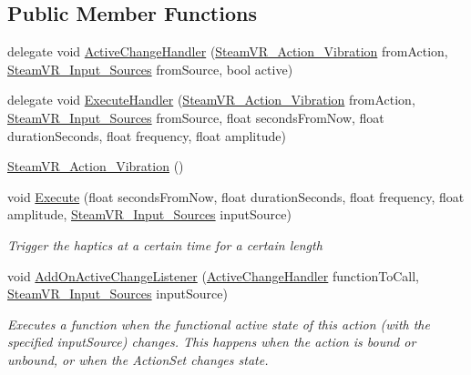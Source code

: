 \subsection*{Public Member Functions}
\begin{DoxyCompactItemize}
\item 
delegate void \mbox{\hyperlink{class_valve_1_1_v_r_1_1_steam_v_r___action___vibration_a7706b3c9b71de3bea16a3fab8a882f0b}{Active\+Change\+Handler}} (\mbox{\hyperlink{class_valve_1_1_v_r_1_1_steam_v_r___action___vibration}{Steam\+V\+R\+\_\+\+Action\+\_\+\+Vibration}} from\+Action, \mbox{\hyperlink{namespace_valve_1_1_v_r_a82e5bf501cc3aa155444ee3f0662853f}{Steam\+V\+R\+\_\+\+Input\+\_\+\+Sources}} from\+Source, bool active)
\item 
delegate void \mbox{\hyperlink{class_valve_1_1_v_r_1_1_steam_v_r___action___vibration_ac075e9e8f3e9eea89be32c403e6f86d5}{Execute\+Handler}} (\mbox{\hyperlink{class_valve_1_1_v_r_1_1_steam_v_r___action___vibration}{Steam\+V\+R\+\_\+\+Action\+\_\+\+Vibration}} from\+Action, \mbox{\hyperlink{namespace_valve_1_1_v_r_a82e5bf501cc3aa155444ee3f0662853f}{Steam\+V\+R\+\_\+\+Input\+\_\+\+Sources}} from\+Source, float seconds\+From\+Now, float duration\+Seconds, float frequency, float amplitude)
\item 
\mbox{\hyperlink{class_valve_1_1_v_r_1_1_steam_v_r___action___vibration_a8fafb6f9a381a3e3084686eb1cd9d1f2}{Steam\+V\+R\+\_\+\+Action\+\_\+\+Vibration}} ()
\item 
void \mbox{\hyperlink{class_valve_1_1_v_r_1_1_steam_v_r___action___vibration_adf68478c0b7a984b01228ba17d1ce196}{Execute}} (float seconds\+From\+Now, float duration\+Seconds, float frequency, float amplitude, \mbox{\hyperlink{namespace_valve_1_1_v_r_a82e5bf501cc3aa155444ee3f0662853f}{Steam\+V\+R\+\_\+\+Input\+\_\+\+Sources}} input\+Source)
\begin{DoxyCompactList}\small\item\em Trigger the haptics at a certain time for a certain length \end{DoxyCompactList}\item 
void \mbox{\hyperlink{class_valve_1_1_v_r_1_1_steam_v_r___action___vibration_afce165e6e31e7a65b14d978976cd028c}{Add\+On\+Active\+Change\+Listener}} (\mbox{\hyperlink{class_valve_1_1_v_r_1_1_steam_v_r___action___vibration_a7706b3c9b71de3bea16a3fab8a882f0b}{Active\+Change\+Handler}} function\+To\+Call, \mbox{\hyperlink{namespace_valve_1_1_v_r_a82e5bf501cc3aa155444ee3f0662853f}{Steam\+V\+R\+\_\+\+Input\+\_\+\+Sources}} input\+Source)
\begin{DoxyCompactList}\small\item\em Executes a function when the {\itshape functional} active state of this action (with the specified input\+Source) changes. This happens when the action is bound or unbound, or when the Action\+Set changes state. \end{DoxyCompactList}\item 

\end{DoxyCompactItemize}
